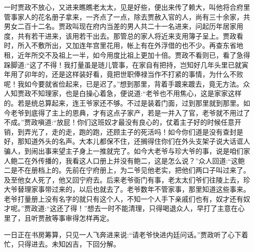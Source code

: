 \begin{parag}
\end{parag}


\begin{parag}
    一时贾政不放心，又进来瞧瞧老太太，见是好些，便出来传了赖大，叫他将合府里管事家人的花名册子拿来，一齐点了一点，除去贾赦入官的人，尚有三十余家，共男女二百十二名。贾政叫现在府内当差的男人共二十一名进来，问起历年居家用度，共有若干进来，该用若干出去。那管总的家人将近来支用簿子呈上。贾政看时，所入不敷所出，又加连年宫里花用，帐上有在外浮借的也不少。再查东省地租，近年所交不及祖上一半，如今用度比祖上更加十倍。贾政不看则已，看了急得跺脚道:“这了不得！我打量虽是琏儿管事，在家自有把持，岂知好几年头里已就寅年用了卯年的，还是这样装好看，竟把世职俸禄当作不打紧的事情，为什么不败呢！我如今要就省俭起来，已是迟了。”想到那里，背着手踱来踱去，竟无方法。众人知贾政不知理家，也是白操心着急，便说道:“老爷也不用焦心，这是家家这样的。若是统总算起来，连王爷家还不够。不过是装着门面，过到那里就到那里。如今老爷到底得了主上的恩典，才有这点子家产，若是一并入了官，老爷就不用过了不成。”贾政嗔道:“放屁！你们这班奴才最没有良心的，仗着主子好的时候任意开销，到弄光了，走的走，跑的跑，还顾主子的死活吗！如今你们道是没有查封是好，那知道外头的名声。大本儿都保不住，还搁得住你们在外头支架子说大话诓人骗人，到闹出事来望主子身上一推就完了。如今大老爷与珍大爷的事，说是咱们家人鲍二在外传播的，我看这人口册上并没有鲍二，这是怎么说？”众人回道:“这鲍二是不在册档上的。先前在宁府册上，为二爷见他老实，把他们两口子叫过来了。及至他女人死了，他又回宁府去。后来老爷衙门有事，老太太们爷们往陵上去，珍大爷替理家事带过来的，以后也就去了。老爷数年不管家事，那里知道这些事来。老爷打量册上没有名字的就只有这个人，不知一个人手下亲戚们也有，奴才还有奴才呢。”贾政道:“这还了得！”想去一时不能清理，只得喝退众人，早打了主意在心里了，且听贾赦等事审得怎样再定。
\end{parag}


\begin{parag}
    一日正在书房筹算，只见一人飞奔进来说:“请老爷快进内廷问话。”贾政听了心下着忙，只得进去。未知凶吉，下回分解。
\end{parag}
